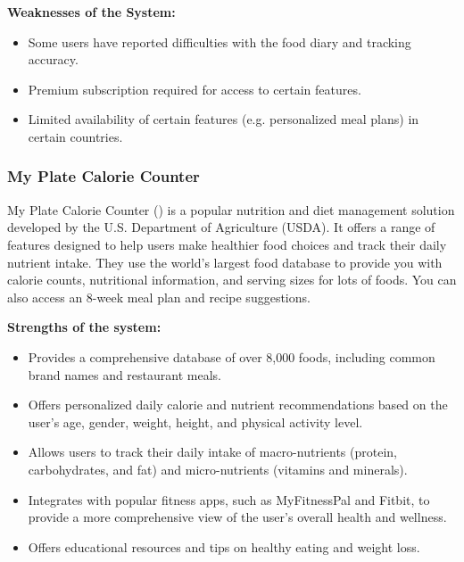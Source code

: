 \documentclass{article}
\begin{document}
\textbf{Weaknesses of the System:}
\begin{itemize}
\item Some users have reported difficulties with the food diary and tracking accuracy.
\item Premium subscription required for access to certain features.
\item Limited availability of certain features (e.g. personalized meal plans) in certain countries.
\end{itemize}


\subsubsection{My Plate Calorie Counter}

My Plate Calorie Counter (\cite{myplate}) is a popular nutrition and diet management solution developed by the U.S. Department of Agriculture (USDA). It offers a range of features designed to help users make healthier food choices and track their daily nutrient intake. They use the world’s largest food database to provide you with calorie counts, nutritional information, and serving sizes for lots of foods. You can also access an 8-week meal plan and recipe suggestions.

\textbf{Strengths of the system:}
\begin{itemize}

\item Provides a comprehensive database of over 8,000 foods, including common brand names and restaurant meals.
\item Offers personalized daily calorie and nutrient recommendations based on the user's age, gender, weight, height, and physical activity level.
\item Allows users to track their daily intake of macro-nutrients (protein, carbohydrates, and fat) and micro-nutrients (vitamins and minerals).
\item Integrates with popular fitness apps, such as MyFitnessPal and Fitbit, to provide a more comprehensive view of the user's overall health and wellness.
\item Offers educational resources and tips on healthy eating and weight loss.

\end{itemize}
\end{document}
